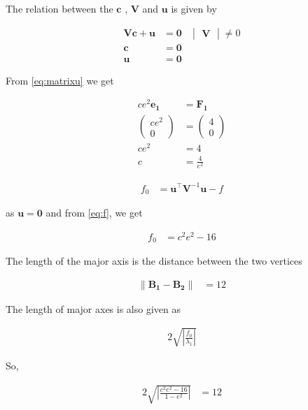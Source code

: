 \documentclass{beamer}
\theoremstyle{remark}
\providecommand{\norm}[1]{\lVert#1\rVert}
\newcommand{\myvec}[1]{\ensuremath{\begin{pmatrix}#1\end{pmatrix}}}
\newcommand{\mydet}[1]{\ensuremath{\begin{vmatrix}#1\end{vmatrix}}}
\let\vec\mathbf
\numberwithin{equation}{section}
\begin{document}
\begin{frame}
The relation between the $\vec{c}$ , $\vec{V}$ and $\vec{u}$ is given by 

\begin{align}
  \vec{V}\vec{c} + \vec{u} &= \vec{0} & \mydet{\vec{V}} \neq 0 \\
  \vec{c} &= \vec{0}\\
  \vec{u} &= \vec{0}
\end{align}

From \eqref{eq:matrixu} we get 

\begin{align}
  ce^2\vec{e_1} &= \vec{F_1}\\
  \myvec{ce^2\\0} &= \myvec{4\\0}\\
  ce^2 &= 4\\
  c &= \frac{4}{e^2} \label{eq:c}
\end{align}

\begin{align}
  f_0 &= \vec{u}^\top\vec{V}^{-1}\vec{u} - f
\end{align}
\end{frame}
\begin{frame}
as $\vec{u}=\vec{0}$ and from \eqref{eq:f}, we get 

\begin{align}
  f_0 &= c^2e^2 - 16
\end{align}

The length of the major axis is the distance between the two vertices 

\begin{align}
  \norm{\vec{B_1}-\vec{B_2}} &= 12
\end{align}

The length of major axes is also given as 

\begin{align}
  2\sqrt{\left|\frac{f_0}{\lambda_1}\right|}
\end{align}

So,

\begin{align}
  2\sqrt{\left|\frac{c^2e^2 - 16}{1 - e^2}\right|} &= 12
\end{align}
\end{frame}
\end{document}
